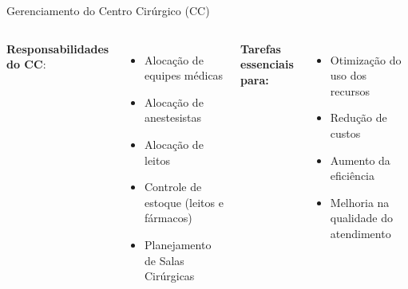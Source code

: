 \documentclass[handout]{beamer}
\newcommand{\ca}[1]{\textcolor{cr}{#1}}
\begin{document}
\begin{frame}{Gerenciamento do Centro Cirúrgico (CC)}
    \begin{columns}[t]
        \textbf{Responsabilidades do CC}:
        \begin{itemize}
            \setlength\itemsep{1em}
            \item<3-> Alocação de equipes médicas
            \item<4-> Alocação de anestesistas
            \item<5-> Alocação de leitos
            \item<6-> Controle de estoque (leitos e fármacos)
            \item<7-> \ca{Planejamento de Salas Cirúrgicas}
        \end{itemize}
        \textbf{Tarefas essenciais para:}
        \begin{itemize}
            \setlength\itemsep{1em}
            \item<9-> Otimização do uso dos recursos
            \item<10-> Redução de custos
            \item<11-> Aumento da eficiência
            \item<12-> Melhoria na qualidade do atendimento
        \end{itemize}
    \end{columns}
\end{frame}
\end{document}
